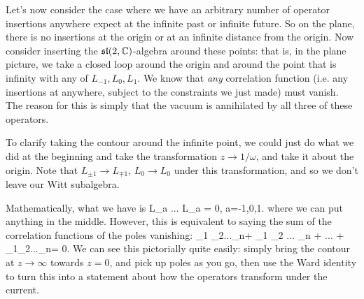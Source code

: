 Let's now consider the case where we have an arbitrary number of operator insertions anywhere expect at the infinite past or infinite future. So on the plane, there is no insertions at the origin or at an infinite distance from the origin. Now consider inserting the $\mathfrak{sl}(2,\mathbb{C})$-algebra around these points: that is, in the plane picture, we take a closed loop around the origin and around the point that is infinity with any of $L_{-1},L_0,L_1$. We know that \textit{any} correlation function (i.e. any insertions at anywhere, subject to the constraints we just made) must vanish. The reason for this is simply that the vacuum is annihilated by all three of these operators. 

To clarify taking the contour around the infinite point, we could just do what we did at the beginning and take the transformation $z\to 1/\omega$, and take it about the origin. Note that $L_{\pm1} \to L_{\mp1}$, $L_0\to L_0$ under this transformation, and so we don't leave our Witt subalgebra. 

Mathematically, what we have is 
\bse 
    \langle L_a ... L_a \rangle = 0, \qquad \forall a=-1,0,1.
\ese 
where we can put anything in the middle. However, this is equivalent to saying the sum of the correlation functions of the poles vanishing:
\be 
    \langle \del \cO_1 \cO_2...\cO_n\rangle + \langle \cO_1 \del\cO_2 ... \cO_n \rangle + ... + \langle \cO_1\cO_2...\del\cO_n\rangle = 0.
\ee 
We can see this pictorially quite easily: simply bring the contour at $z\to\infty$ towards $z=0$, and pick up poles as you go, then use the Ward identity to turn this into a statement about how the operators transform under the current.

